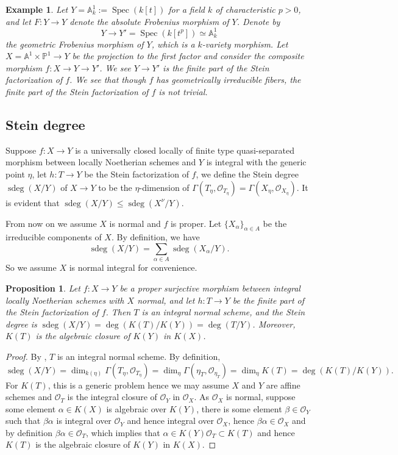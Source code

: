\documentclass[letterpaper,reqno,12pt]{amsart}
\DeclareMathOperator{\Spec}{Spec}
\DeclareMathOperator{\sdeg}{sdeg}
\numberwithin{equation}{section}
\theoremstyle{plain}
\newtheorem{proposition}[theorem]{Proposition}
\newtheorem{example}{Example}[section]
\begin{document}
\begin{example}
    Let $Y=\mathbb A^1_k:=\Spec(k[t])$ for a field $k$ of characteristic $p>0$, and let $F:Y\to Y$ denote the absolute Frobenius morphism of $Y$. Denote by 
    \[Y\to Y'=\Spec (k[t^p])\simeq \mathbb A^1_k\]
    the geometric Frobenius morphism of $Y$, which is a $k$-variety morphism. Let $X=\mathbb A^1\times \mathbb P^1\to Y$ be the projection to the first factor and consider the composite morphism $f:X\to Y\to Y'$. We see $Y\to Y'$ is the finite part of the Stein factorization of $f$. We see that though $f$ has geometrically irreducible fibers, the finite part of the Stein factorization of $f$ is not trivial.
\end{example}
\subsection{Stein degree}
Suppose $f:X\to Y$ is a universally closed locally of finite type quasi-separated morphism between locally Noetherian schemes and $Y$ is integral with the generic point $\eta$, let $h:T\to Y$ be the Stein factorization of $f$, we define the Stein degree $\sdeg(X/Y)$ of $X\to Y$ to be the $\eta$-dimension of $\Gamma(T_\eta,\mathcal O_{T_\eta})=\Gamma(X_\eta,\mathcal O_{X_\eta})$.%
It is evident that $\sdeg(X/Y)\leq \sdeg (X^\nu/Y)$.

From now on we assume $X$ is normal and $f$ is proper. Let $\{X_\alpha\}_{\alpha\in A}$ be the irreducible components of $X$. By definition, we have \[\sdeg(X/Y)=\sum\limits_{\alpha\in A}\sdeg(X_\alpha/Y).\] So we assume $X$ is normal integral for convenience.

\begin{proposition}\label{sdeg_normal}
    Let $f:X\to Y$ be a proper surjective morphism between integral locally Noetherian schemes with $X$ normal, and let $h\colon T\to Y$ be the finite part of the Stein factorization of $f$. Then $T$ is an integral normal scheme, and the Stein degree is $\sdeg(X/Y)=\deg(K(T)/K(Y))=\deg(T/Y)$. Moreover, $K(T)$ is the algebraic closure of $K(Y)$ in $K(X)$.
\end{proposition}
\begin{proof}
    By  \cite[\href{https://stacks.math.columbia.edu/tag/035L}{Tag 035L}]{stacks-project},%
    $T$ is an integral normal scheme. By definition, \[\sdeg(X/Y)=\dim_{k(\eta)}\Gamma(T_\eta,\mathcal O_{T_\eta})=\dim_\eta\Gamma(\eta_T,\mathcal O_{\eta_T})=\dim_\eta K(T)=\deg(K(T)/K(Y)).\]%
    For $K(T)$, this is a generic problem hence we may assume $X$ and $Y$ are affine schemes and $\mathcal O_T$ is the integral closure of $\mathcal O_Y$ in $\mathcal O_X$. As $\mathcal O_X$ is normal, suppose some element $\alpha\in K(X)$ is algebraic over $K(Y)$, there is some element $\beta\in \mathcal O_Y$ such that $\beta\alpha$ is integral over $\mathcal O_Y$ and hence integral over $\mathcal O_X$, hence $\beta\alpha\in\mathcal O_X$ and by definition $\beta\alpha\in\mathcal O_T$, which implies that $\alpha\in K(Y)\mathcal O_T\subset K(T)$ and hence $K(T)$ is the algebraic closure of $K(Y)$ in $K(X)$.%
\end{proof}
\end{document}
